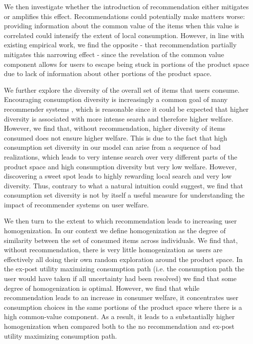 \documentclass[format=acmsmall, review=false]{acmart}
\newcommand{\xhdr}[1]{\vspace{1mm} \noindent{\bf #1}}
\begin{document}
\par 
We then investigate whether the introduction of recommendation either mitigates or amplifies this effect. Recommendations could potentially make matters worse: providing information about the common value of the items when this value is correlated could intensify the extent of local consumption. However, in line with existing empirical work, we find the opposite - that recommendation partially mitigates this narrowing effect - since the revelation of the common value component allows for users to escape being stuck in portions of the product space due to lack of information about other portions of the product space.
\par
\xhdr{Additional Findings} We further explore the diversity of the overall set of items that users consume. Encouraging consumption diversity is increasingly a common goal of many recommender systems \cite{castells2015novelty, kunaver2017diversity}, which is reasonable since it could be expected that higher diversity is associated with more intense search and therefore higher welfare. However, we find that, without recommendation, higher diversity of items consumed does not ensure higher welfare. This is due to the fact that high consumption set diversity in our model can arise from a sequence of bad realizations, which leads to very intense search over very different parts of the product space and high consumption diversity but very low welfare. However, discovering a sweet spot leads to highly rewarding local search and very low diversity. Thus, contrary to what a natural intuition could suggest, we find that consumption set diversity is not by itself a useful measure for understanding the impact of recommender systems on user welfare.
\par
We then turn to the extent to which recommendation leads to increasing user homogenization. In our context we define homogenization as the degree of similarity between the set of consumed items across individuals. We find that, without recommendation, there is very little homogenization as users are effectively all doing their own random exploration around the product space. In the ex-post utility maximizing consumption path (i.e. the consumption path the user would have taken if all uncertainty had been resolved) we find that some degree of homogenization is optimal. However, we find that while recommendation leads to an increase in consumer welfare, it concentrates user consumption choices in the same portions of the product space where there is a high common-value component. As a result, it leads to a substantially higher homogenization when compared both to the no recommendation and ex-post utility maximizing consumption path.
\end{document}
